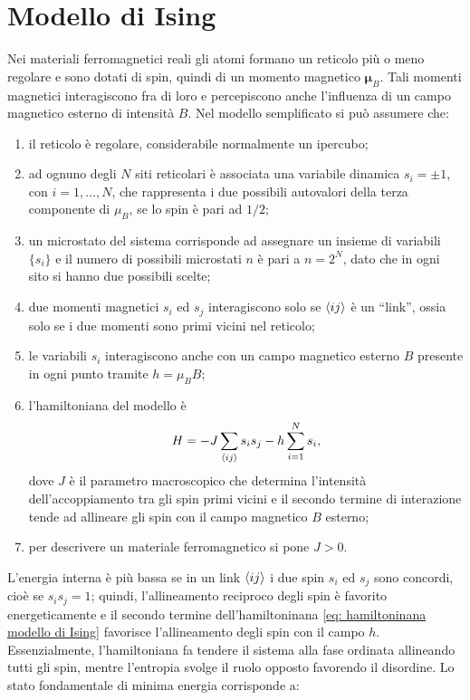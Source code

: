 \section{Modello di Ising}
Nei materiali ferromagnetici reali gli atomi formano un reticolo più o meno regolare e sono dotati di spin, quindi di un momento magnetico $\bm{\mu}_B$. Tali momenti magnetici interagiscono fra di loro e percepiscono anche l'influenza di un campo magnetico esterno di intensità $B$. Nel modello semplificato si può assumere che:
\begin{enumerate}
    \item il reticolo è regolare, considerabile normalmente un ipercubo;
    \item ad ognuno degli $N$ siti reticolari è associata una variabile dinamica $s_i = \pm 1$, con $i = 1,\dots,N$, che rappresenta i due possibili autovalori della terza componente di $\mu_B$, se lo spin è pari ad $1/2$;
    \item un microstato del sistema corrisponde ad assegnare un insieme di variabili $\{s_i\}$ e il numero di possibili microstati $n$ è pari a $n = 2^N$, dato che in ogni sito si hanno due possibili scelte;
    \item due momenti magnetici $s_i$ ed $s_j$ interagiscono solo se $\langle ij \rangle$ è un ``link'', ossia solo se i due momenti sono primi vicini nel reticolo;
    \item le variabili $s_i$ interagiscono anche con un campo magnetico esterno $B$ presente in ogni punto tramite $h = \mu_BB$;
    \item l'hamiltoniana del modello è 
    \begin{equation}
    \label{eq: hamiltoninana modello di Ising}
        H = -J\sum_{\langle ij \rangle}s_is_j - h\sum_{i=1}^Ns_i,
    \end{equation}
    dove $J$ è il parametro macroscopico che determina l'intensità dell'accoppiamento tra gli spin primi vicini e il secondo termine di interazione tende ad allineare gli spin con il campo magnetico $B$ esterno;
    \item per descrivere un materiale ferromagnetico si pone $J > 0$.
\end{enumerate}
L'energia interna è più bassa se in un link $\langle ij \rangle$ i due spin $s_i$ ed $s_j$ sono concordi, cioè se $s_is_j = 1$; quindi, l'allineamento reciproco degli spin è favorito energeticamente e il secondo termine dell'hamiltoninana \eqref{eq: hamiltoninana modello di Ising} favorisce l'allineamento degli spin con il campo $h$. Essenzialmente, l'hamiltoniana fa tendere il sistema alla fase ordinata allineando tutti gli spin, mentre l'entropia svolge il ruolo opposto favorendo il disordine. Lo stato fondamentale di minima energia corrisponde a:
